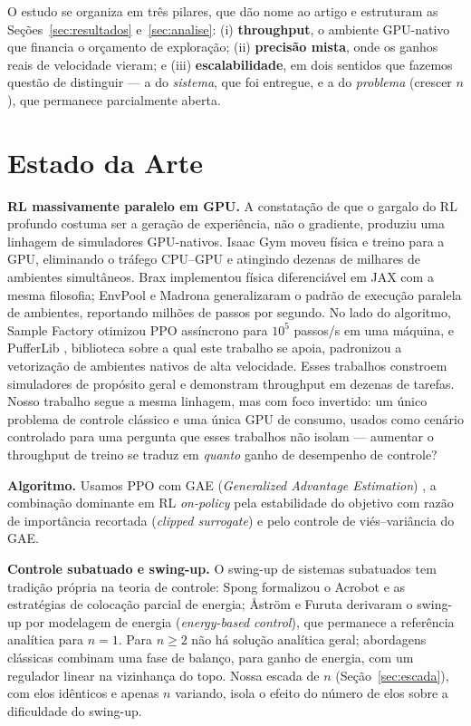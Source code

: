 \documentclass[12pt]{article}
\begin{document}
O estudo se organiza em três pilares, que dão nome ao artigo e estruturam as
Seções~\ref{sec:resultados} e~\ref{sec:analise}: (i) \textbf{throughput}, o
ambiente GPU-nativo que financia o orçamento de exploração;
(ii) \textbf{precisão mista}, onde os ganhos reais de velocidade vieram; e
(iii) \textbf{escalabilidade}, em dois sentidos que
fazemos questão de distinguir --- a do \emph{sistema}, que foi entregue, e a
do \emph{problema} (crescer $n$), que permanece parcialmente aberta.

\section{Estado da Arte}\label{sec:sota}

\textbf{RL massivamente paralelo em GPU.} A constatação de que o gargalo do RL
profundo costuma ser a geração de experiência, não o gradiente, produziu uma
linhagem de simuladores GPU-nativos. Isaac Gym \cite{makoviychuk2021} moveu
física e treino para a GPU, eliminando o tráfego CPU--GPU e atingindo dezenas
de milhares de ambientes simultâneos. Brax \cite{freeman2021} implementou
física diferenciável em JAX com a mesma filosofia; EnvPool \cite{weng2022} e
Madrona \cite{shacklett2023} generalizaram o padrão de execução paralela de
ambientes, reportando milhões de passos por segundo. No lado do algoritmo,
Sample Factory \cite{petrenko2020} otimizou PPO assíncrono para $10^5$
passos/s em uma máquina, e PufferLib \cite{suarez2024}, biblioteca sobre a
qual este trabalho se apoia, padronizou a vetorização de ambientes nativos de
alta velocidade. Esses trabalhos constroem simuladores de propósito geral e
demonstram throughput em dezenas de tarefas. Nosso trabalho segue a mesma
linhagem, mas com foco invertido: um único problema de controle clássico e uma
única GPU de consumo, usados como cenário controlado para uma pergunta que
esses trabalhos não isolam --- aumentar o throughput de treino se traduz em
\emph{quanto} ganho de desempenho de controle?

\textbf{Algoritmo.} Usamos PPO \cite{schulman2017} com GAE
(\emph{Generalized Advantage Estimation}) \cite{schulman2016}, a combinação dominante em RL
\emph{on-policy} pela estabilidade do objetivo com razão de importância
recortada (\emph{clipped surrogate}) e pelo controle de viés--variância do GAE.

\textbf{Controle subatuado e swing-up.} O swing-up de sistemas subatuados tem
tradição própria na teoria de controle: Spong \cite{spong1995} formalizou o
Acrobot e as estratégias de colocação parcial de energia;
Åström e Furuta \cite{astrom2000} derivaram o swing-up por modelagem de energia
(\emph{energy-based control}), que permanece a referência analítica para
$n{=}1$. Para $n \geq 2$ não há solução analítica geral; abordagens clássicas
combinam uma fase de balanço, para ganho de energia, com um regulador linear
na vizinhança do topo.
Nossa escada de $n$ (Seção~\ref{sec:escada}), com elos idênticos e apenas $n$
variando, isola o efeito do número de elos sobre a dificuldade do swing-up.
\end{document}
